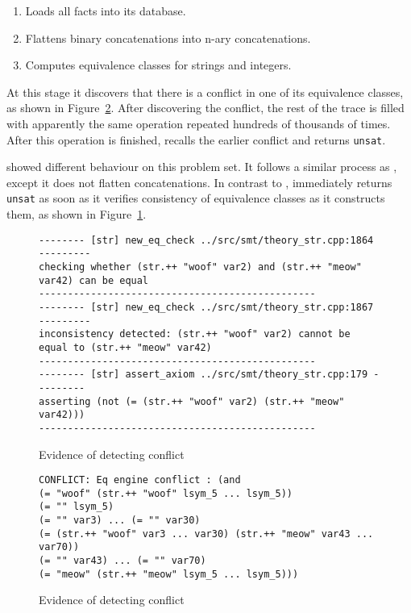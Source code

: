             \begin{enumerate}
                \item Loads all facts into its database.
                \item Flattens binary concatenations into n-ary concatenations.
                \item Computes equivalence classes for strings and integers.
            \end{enumerate}

            At this stage it discovers that there is a conflict in one of its equivalence classes, as shown in Figure~\ref{fig:cvc4-conflict}. After discovering the conflict, the rest of the trace is filled with apparently the same operation repeated hundreds of thousands of times. After this operation is finished, \cvc{} recalls the earlier conflict and returns \texttt{unsat}.

            \us{} showed different behaviour on this problem set. It follows a similar process as \cvc{}, except it does not flatten concatenations. In contrast to \cvc{}, \us{} immediately returns \texttt{unsat} as soon as it verifies consistency of equivalence classes as it constructs them, as shown in Figure~\ref{fig:z3str3-conflict}.

            \begin{figure}[h]
                {\scriptsize\begin{verbatim}
-------- [str] new_eq_check ../src/smt/theory_str.cpp:1864 ---------
checking whether (str.++ "woof" var2) and (str.++ "meow" var42) can be equal
------------------------------------------------
-------- [str] new_eq_check ../src/smt/theory_str.cpp:1867 ---------
inconsistency detected: (str.++ "woof" var2) cannot be equal to (str.++ "meow" var42)
------------------------------------------------
-------- [str] assert_axiom ../src/smt/theory_str.cpp:179 ---------
asserting (not (= (str.++ "woof" var2) (str.++ "meow" var42)))
------------------------------------------------\end{verbatim}}
                \caption{Evidence of \us{} detecting conflict}
                \label{fig:z3str3-conflict}
            \end{figure}

            \begin{figure}[h]
                {\scriptsize\begin{verbatim}
CONFLICT: Eq engine conflict : (and
(= "woof" (str.++ "woof" lsym_5 ... lsym_5))
(= "" lsym_5)
(= "" var3) ... (= "" var30)
(= (str.++ "woof" var3 ... var30) (str.++ "meow" var43 ... var70))
(= "" var43) ... (= "" var70)
(= "meow" (str.++ "meow" lsym_5 ... lsym_5)))\end{verbatim}}
                \caption{Evidence of \cvc{} detecting conflict}
                \label{fig:cvc4-conflict}
            \end{figure}


